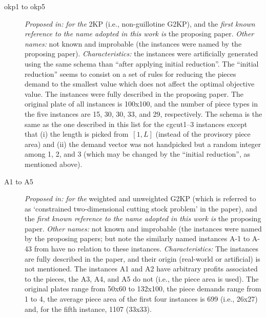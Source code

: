\documentclass[ppgc,tese,english,formais,babel]{iiufrgs}
\begin{document}
\begin{description}
\item [okp1 to okp5] \emph{Proposed in:} \citet{fekete:1997} \emph{for the} 2KP (i.e., non-guillotine G2KP), and the \emph{first known reference to the name adopted in this work is} the proposing paper. \emph{Other names:} not known and improbable (the instances were named by the proposing paper). \emph{Characteristics: } the instances were artificially generated using the same schema than \citet{beasley:1985:nonguillotine} ``after applying initial reduction''. The ``initial reduction'' seems to consist on a set of rules for reducing the pieces demand to the smallest value which does not affect the optimal objective value. The instances were fully described in the proposing paper. The original plate of all instances is 100x100, and the number of piece types in the five instances are 15, 30, 30, 33, and 29, respectively. The schema is the same as the one described in this list for the cgcut1--3 instances except that (i) the length is picked from~\([1, L]\) (instead of the provisory piece area) and (ii) the demand vector was not handpicked but a random integer among 1, 2, and 3 (which may be changed by the ``initial reduction'', as mentioned above).
\item [A1 to A5] \emph{Proposed in:} \citet{hifi:1997} \emph{for the} weighted and unweighted G2KP (which is referred to as `constrained two-dimensional cutting stock problem' in the paper), and the \emph{first known reference to the name adopted in this work is} the proposing paper. \emph{Other names:} not known and improbable (the instances were named by the proposing papers; but note the similarly named instances A-1 to A-43 from \citet{macedo:2010} have no relation to these instances. \emph{Characteristics: } The instances are fully described in the paper, and their origin (real-world or artificial) is not mentioned. The instances A1 and A2 have arbitrary profits associated to the pieces, the A3, A4, and A5 do not (i.e., the piece area is used). The original plates range from 50x60 to 132x100, the piece demands range from 1 to 4, the average piece area of the first four instances is 699 (i.e., 26x27) and, for the fifth instance, 1107 (33x33).

\end{description}
\end{document}
